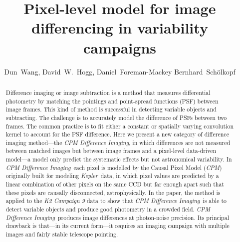 \documentclass[12pt, preprint]{aastex}
\newcommand{\project}[1]{\textsl{#1}}
\newcommand{\cpm}{\project{CPM}}
\newcommand{\cpmdiff}{\project{CPM Difference Imaging}}
\newcommand{\kepler}{\project{Kepler}}
\begin{document}
\title{Pixel-level model for image differencing in variability campaigns}
\author{%
  Dun~Wang\altaffilmark{\ref{CCPP}},
  David~W.~Hogg\altaffilmark{\ref{CCPP},\ref{CDS},\ref{MPIA},\ref{email}},
  Daniel~Foreman-Mackey\altaffilmark{\ref{UW},\ref{SF}}
  Bernhard~Sch\"olkopf\altaffilmark{\ref{MPIIS}}
  }
\setcounter{address}{1}


\begin{abstract}
Difference imaging or image subtraction is a method that measures differential photometry by matching the pointings and point-spread functions (PSF) between image frames. 
This kind of method is successful in detecting variable objects and subtracting. The challenge is to accurately model the difference of PSFs between two frames. The common practice is to fit either a constant or spatially varying convolution kernel to account for the PSF difference.
Here we present a new category of difference imaging method---the \cpmdiff, in which differences are not measured between matched images but between image frames and a pixel-level data-driven model---a model only predict the systematic effects but not astronomical variability. 
In \cpmdiff\ each pixel is modelled by the Causal Pixel Model (\cpm) originally built for modeling \kepler\ data, in which pixel values are predicted by a linear combination of other pixels on the same CCD but far enough apart such that these pixels are causally disconnected, astrophysically. 
In the paper, the method is applied to the \project{K2 Campaign 9} data to show that \cpmdiff\ is able to detect variable objects and produce good photometry in a crowded field.
\cpmdiff\ produces image differences at photon-noise precision. 
Its principal drawback is that---in its current form---it requires an imaging campaign with multiple images and fairly stable telescope pointing.

\end{abstract}
\end{document}
